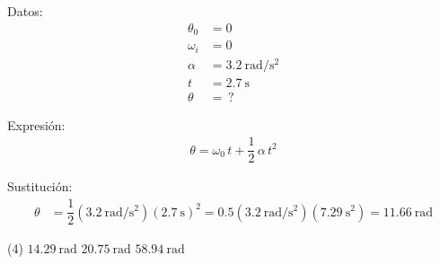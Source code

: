 \documentclass[12pt, letter]{exam}
\begin{document}
\begin{questions}
    \begin{minipage}[t]{0.4\linewidth}
    Datos: 
    \begin{align*}
    \theta_{0} &= 0 \\
    \omega_{i} &= 0 \\
    \alpha &= \SI{3.2}{\radian\per\square\second} \\
    t &= \SI{2.7}{\second} \\
    \theta &= \, ?
    \end{align*}
    \end{minipage}
    \hspace{1cm}
    \begin{minipage}[t]{0.4\linewidth}
    Expresión:
    \begin{align*}
    \theta = \omega_{0} \, t + \dfrac{1}{2} \, \alpha \,  t^{2}
    \end{align*}
    \end{minipage}

    Sustitución:
    \begin{align*}
    \theta &= \dfrac{1}{2} \left( \SI[per-mode=fraction]{3.2}{\radian\per\square\second} \right) \left( \SI{2.7}{\second} \right)^{2} = 0.5 \left( \SI[per-mode=fraction]{3.2}{\radian\per\square\second} \right) \left( \SI{7.29}{\square\second} \right) = \SI{11.66}{\radian}
    \end{align*}

    \vspace{0.3cm}
    \begin{tasks}(4)
        \task $\displaystyle \SI[per-mode=fraction]{14.29}{\radian}$
        \task $\displaystyle \SI[per-mode=fraction]{20.75}{\radian}$
        \task $\displaystyle \SI[per-mode=fraction]{58.94}{\radian}$
        \task {}
    \end{tasks}


\end{questions}
\end{document}
